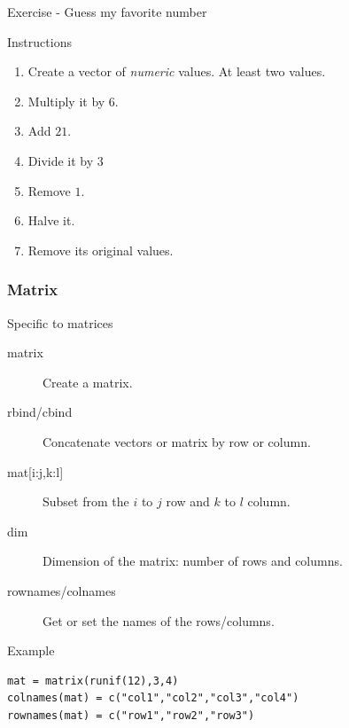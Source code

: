 \documentclass[10pt]{beamer}
\newenvironment{xframe}[2][]
  {\begin{frame}[fragile,environment=xframe,#1]
  \frametitle{#2}}
  {\end{frame}}
\begin{document}

\begin{frame}{Exercise - Guess my favorite number}
  \begin{block}{Instructions}
    \begin{enumerate}
    \item Create a vector of {\it numeric} values. At least two values.
    \item Multiply it by $6$.
    \item Add $21$.
    \item Divide it by $3$ 
    \item Remove $1$.
    \item Halve it.
    \item Remove its original values.
    \end{enumerate}
  \end{block}

\end{frame}



\begin{xframe}{Matrix}
  \begin{block}{Specific to matrices}
    \begin{description}
    \item[matrix] Create a matrix.
    \item[rbind/cbind] Concatenate vectors or matrix by row or column.
    \item[{mat[i:j,k:l]} ] Subset from the $i$ to $j$ row and $k$ to $l$ column.
    \item[dim] Dimension of the matrix: number of rows and columns.
    \item[rownames/colnames] Get or set the names of the rows/columns.
    \end{description}    
  \end{block}
  \begin{exampleblock}{Example}
\begin{verbatim}
mat = matrix(runif(12),3,4)
colnames(mat) = c("col1","col2","col3","col4")
rownames(mat) = c("row1","row2","row3")
\end{verbatim}
  \end{exampleblock}
\end{xframe}
\end{document}

